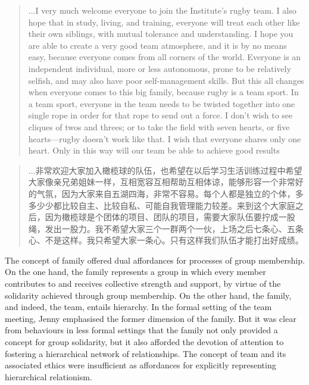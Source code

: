   \begin{quotation}
  ...I very much welcome everyone to join the Institute's rugby team. I also hope that in study, living, and training, everyone will treat each other like their own siblings, with mutual tolerance and understanding.  I hope you are able to create a very good team atmosphere, and it is by no means easy, because everyone comes from all corners of the world. Everyone is an independent individual, more or less autonomous, prone to be relatively selfish, and may also have poor self-management skills.  But this all changes when everyone comes to this big family, because rugby is a team sport. In a team sport, everyone in the team needs to be twisted together into one single rope in order for that rope to send out a force. I don't wish to see cliques of twos and threes; or to take the field with seven hearts, or five hearts---rugby doesn't work like that. I wish that everyone shares only one heart. Only in this way will our team be able to achieve good results
  \end{quotation}

  \begin{CJK}{UTF8}{gbsn}
  \begin{quotation}
    ...非常欢迎大家加入橄榄球的队伍，也希望在以后学习生活训练过程中希望大家像亲兄弟姐妹一样，互相宽容互相帮助互相体谅，能够形容一个非常好的气氛，因为大家来自五湖四海，非常不容易。每个人都是独立的个体，多多少少都比较自主、比较自私、可能自我管理能力较差。来到这个大家庭之后，因为橄榄球是个团体的项目、团队的项目，需要大家队伍要拧成一股绳，发出一股力。我不希望大家三个一群两个一伙，上场之后七条心、五条心、不是这样。我只希望大家一条心。只有这样我们队伍才能打出好成绩。
  \end{quotation}
  \end{CJK}

  The concept of family offered dual affordances for processes of group membership.  On the one hand, the family represents a group in which every member contributes to and receives collective strength and support, by virtue of the solidarity achieved through group membership.  On the other hand, the family, and indeed, the team,  entails hierarchy.  In the formal setting of the team meeting, Jenny emphasised the former dimension of the family.  But it was clear from behaviours in less formal settings that the family not only provided a concept for group solidarity, but it   also afforded the devotion of attention to fostering a hierarchical network of relationships.  The concept of team and its associated ethics were insufficient as  affordances for explicitly representing hierarchical relationism.

